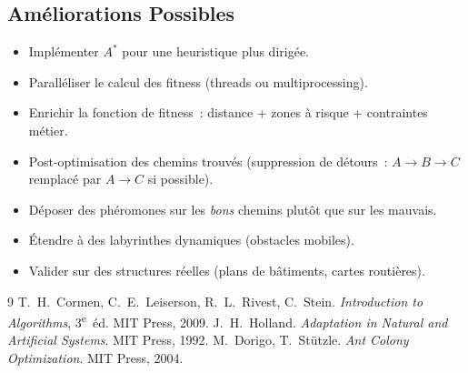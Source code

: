\documentclass[12pt, a4paper]{article}
\theoremstyle{definition}
\theoremstyle{remark}
\begin{document}
\subsection{Améliorations Possibles}

\begin{itemize}
    \item Implémenter $A^*$ pour une heuristique plus dirigée.
    \item Paralléliser le calcul des fitness (threads ou multiprocessing).
    \item Enrichir la fonction de fitness~: distance + zones à risque + contraintes métier.
    \item Post-optimisation des chemins trouvés (suppression de détours~: $A \to B \to C$
          remplacé par $A \to C$ si possible).
    \item Déposer des phéromones sur les \emph{bons} chemins plutôt que sur les mauvais.
    \item Étendre à des labyrinthes dynamiques (obstacles mobiles).
    \item Valider sur des structures réelles (plans de bâtiments, cartes routières).
\end{itemize}

\begin{thebibliography}{9}
        T.~H.~Cormen, C.~E.~Leiserson, R.~L.~Rivest, C.~Stein.
        \textit{Introduction to Algorithms}, 3\textsuperscript{e}~éd.
        MIT Press, 2009.
        J.~H.~Holland.
        \textit{Adaptation in Natural and Artificial Systems}.
        MIT Press, 1992.
        M.~Dorigo, T.~Stützle.
        \textit{Ant Colony Optimization}.
        MIT Press, 2004.
\end{thebibliography}
\end{document}
